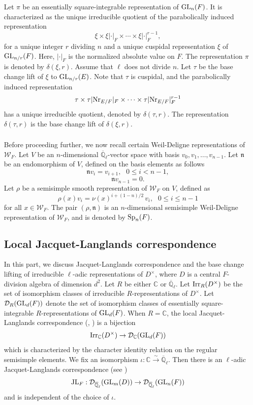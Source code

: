 \documentclass[10pt, reqno]{amsart}
\theoremstyle{plain}
\numberwithin{equation}{section}
\begin{document}
Let $\pi$ be an essentially square-integrable representation of ${\rm GL}_n(F)$. It is characterized as the unique irreducible quotient of the parabolically induced representation 
$$ \xi\times \xi\lvert\cdot\rvert_F\times\cdots
\times\xi\lvert\cdot\rvert_F^{r-1}, $$
for a unique integer $r$ dividing $n$ and a unique cuspidal representation $\xi$ of ${\rm GL}_{n/r}(F)$. Here, $\lvert\cdot\rvert_F$ is the normalized absolute value on $F$. The representation $\pi$ is denoted by $\delta(\xi,r)$.
Assume that $\ell$ does not divide $n$. Let $\tau$ be the base change lift of $\xi$ to ${\rm GL}_{n/r}(E)$. Note that $\tau$ is cuspidal, and the parabolically induced representation
$$ \tau\times\tau\lvert{\rm Nr}_{E/F}\rvert_F\times\cdots\times
\tau\lvert{\rm Nr}_{E/F}\rvert_F^{r-1} $$ has a unique irreducible quotient, denoted by $\delta(\tau,r)$. The representation $\delta(\tau,r)$ is the base change lift of $\delta(\xi,r)$.

\subsubsection{}
Before proceeding further, we now recall certain Weil-Deligne representations of $\mathcal{W}_F$. Let $V$ be an $n$-dimensional $\overline{\mathbb{Q}}_\ell$-vector space with basis $v_0, v_1,\dots,v_{n-1}$. Let $\mathfrak{n}$ be an endomorphism of $V$, defined on the basis elements as follows
$$ \mathfrak{n}v_i = v_{i+1},\,\,\,\, 
0\leq i< n-1,$$
$$ \mathfrak{n}v_{n-1} = 0.$$
Let $\rho$ be a semisimple smooth representation of $\mathcal{W}_F$ on $V$, defined as
$$ \rho(x) v_i = \nu(x)^{i+(1-n)/2}\,v_i,\,\,\,\, 0\leq i\leq n-1 $$
for all $x\in\mathcal{W}_F$. The pair $(\rho,\mathfrak{n})$ is an $n$-dimensional semisimple Weil-Deligne representation of $\mathcal{W}_F$, and is denoted by ${\rm Sp}_n(F)$. 

\subsection{Local Jacquet-Langlands correspondence}
In this part, we discuss Jacquet-Langlands correspondence and the base change lifting of irreducible $\ell$-adic representations of $D^\times$, where $D$ is a central $F$-division algebra of dimension $d^2$. Let $R$ be either $\mathbb{C}$ or $\overline{\mathbb{Q}}_\ell$. Let ${\rm Irr}_{R}(D^\times)$ be the set of isomorphism classes of irreducible $R$-representations of $D^\times$. Let $\mathcal{D}_R({\rm GL}_d(F))$ denote the set of isomorphism classes of essentially square-integrable $R$-representations of ${\rm GL}_d(F)$. When $R=\mathbb{C}$, the local Jacquet-Langlands correspondence (\cite{Automorphic_GL2}, \cite{Badulescu_JL}) is a bijection
$$ {\rm Irr}_{\mathbb{C}}(D^\times)\rightarrow 
\mathcal{D}_{\mathbb{C}}({\rm GL}_d(F)) $$
which is characterized by the character identity relation on the regular semisimple elements. We fix an isomorphism $\iota:\mathbb{C}\xrightarrow{\sim} \overline{\mathbb{Q}}_\ell$. Then there is an $\ell$-adic Jacquet-Langlands correspondence (see \cite{MS_JL})
$$ {\rm JL}_F : \mathcal{D}_{\overline{\mathbb{Q}}_\ell}
({\rm GL}_m(D))\rightarrow \mathcal{D}_{\overline{\mathbb{Q}}_\ell}({\rm GL}_n(F)) $$
and is independent of the choice of $\iota$.
\end{document}
